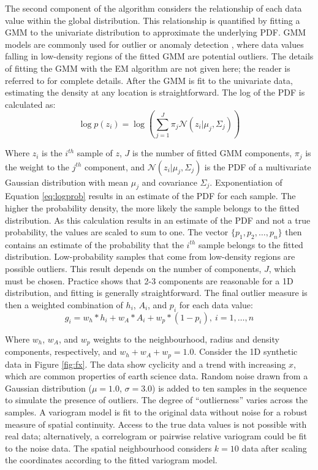 The second component of the algorithm considers the relationship of each data value within the global distribution. This relationship is quantified by fitting a \gls{GMM} to the univariate distribution to approximate the underlying \gls{PDF}. \Gls{GMM} models are commonly used for outlier or anomaly detection \citep{geron2019hands,qu2021anomaly}, where data values falling in low-density regions of the fitted \gls{GMM} are potential outliers. The details of fitting the \gls{GMM} with the \gls{EM} algorithm are not given here; the reader is referred to \cite{mclachlan2019finite} for complete details. After the \gls{GMM} is fit to the univariate data, estimating the density at any location is straightforward. The log of the \gls{PDF} is calculated as:
\begin{equation}
    \log p(z_{i}) = \log \left( \sum_{j=1}^{J} \pi_{j} \mathcal{N}(z_{i}|\mu_{j}, \Sigma_{j}) \right)
    \label{eq:logprob}
\end{equation}

Where $z_{i}$ is the $i^{th}$ sample of $z$, $J$ is the number of fitted \gls{GMM} components, $\pi_{j}$ is the weight to the $j^{th}$ component, and $\mathcal{N}(z_{i}|\mu_{j}, \Sigma_{j})$ is the \gls{PDF} of a multivariate Gaussian distribution with mean $\mu_{j}$ and covariance $\Sigma_{j}$. Exponentiation of Equation \ref{eq:logprob} results in an estimate of the \gls{PDF} for each sample. The higher the probability density, the more likely the sample belongs to the fitted distribution. As this calculation results in an estimate of the \gls{PDF} and not a true probability, the values are scaled to sum to one. The vector $\{p_{1}, p_{2}, \dots, p_{n}\}$ then contains an estimate of the probability that the $i^{th}$ sample belongs to the fitted distribution. Low-probability samples that come from low-density regions are possible outliers. This result depends on the number of components, $J$, which must be chosen. Practice shows that 2-3 components are reasonable for a \gls{1D} distribution, and fitting is generally straightforward. The final outlier measure is then a weighted combination of $h_{i}$, $A_{i}$, and $p_{i}$ for each data value:
\begin{equation}
    g_{i} = w_{h}*h_{i} + w_{A}*A_{i} + w_{p}*(1-p_{i}), \ i = 1, \dots, n
    \label{eq:outlier}
\end{equation}

Where $w_{h}$, $w_{A}$, and $w_{p}$ weights to the neighbourhood, radius and density components, respectively, and $w_{h}+w_{A}+w_{p}=1.0$. Consider the \gls{1D} synthetic data in Figure \ref{fig:fx}. The data show cyclicity and a trend with increasing $x$, which are common properties of earth science data. Random noise drawn from a Gaussian distribution ($\mu=1.0$, $\sigma=3.0$) is added to ten samples in the sequence to simulate the presence of outliers. The degree of ``outlierness'' varies across the samples. A variogram model is fit to the original data without noise for a robust measure of spatial continuity. Access to the true data values is not possible with real data; alternatively, a correlogram or pairwise relative variogram could be fit to the noise data. The spatial neighbourhood considers $k=10$ data after scaling the coordinates according to the fitted variogram model.

